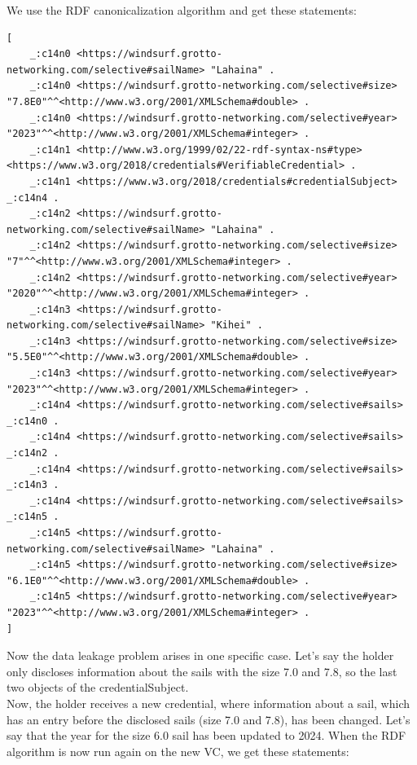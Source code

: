 \documentclass[
	a4paper               %
	,BCOR=0mm            %
	,bibliography=totoc   %
	,listof=totoc         %
	,monolingual
	,twoside=false
]{bfhthesis}              %
\begin{document}
We use the RDF canonicalization algorithm and get these statements:

\begin{lstlisting}[language=canon,firstnumber=1,caption={Example: Sails VC as statements},captionpos=b]
[
	_:c14n0 <https://windsurf.grotto-networking.com/selective#sailName> "Lahaina" .
	_:c14n0 <https://windsurf.grotto-networking.com/selective#size> "7.8E0"^^<http://www.w3.org/2001/XMLSchema#double> .
	_:c14n0 <https://windsurf.grotto-networking.com/selective#year> "2023"^^<http://www.w3.org/2001/XMLSchema#integer> .
	_:c14n1 <http://www.w3.org/1999/02/22-rdf-syntax-ns#type> <https://www.w3.org/2018/credentials#VerifiableCredential> .
	_:c14n1 <https://www.w3.org/2018/credentials#credentialSubject> _:c14n4 .
	_:c14n2 <https://windsurf.grotto-networking.com/selective#sailName> "Lahaina" .
	_:c14n2 <https://windsurf.grotto-networking.com/selective#size> "7"^^<http://www.w3.org/2001/XMLSchema#integer> .
	_:c14n2 <https://windsurf.grotto-networking.com/selective#year> "2020"^^<http://www.w3.org/2001/XMLSchema#integer> .
	_:c14n3 <https://windsurf.grotto-networking.com/selective#sailName> "Kihei" .
	_:c14n3 <https://windsurf.grotto-networking.com/selective#size> "5.5E0"^^<http://www.w3.org/2001/XMLSchema#double> .
	_:c14n3 <https://windsurf.grotto-networking.com/selective#year> "2023"^^<http://www.w3.org/2001/XMLSchema#integer> .
	_:c14n4 <https://windsurf.grotto-networking.com/selective#sails> _:c14n0 .
	_:c14n4 <https://windsurf.grotto-networking.com/selective#sails> _:c14n2 .
	_:c14n4 <https://windsurf.grotto-networking.com/selective#sails> _:c14n3 .
	_:c14n4 <https://windsurf.grotto-networking.com/selective#sails> _:c14n5 .
	_:c14n5 <https://windsurf.grotto-networking.com/selective#sailName> "Lahaina" .
	_:c14n5 <https://windsurf.grotto-networking.com/selective#size> "6.1E0"^^<http://www.w3.org/2001/XMLSchema#double> .
	_:c14n5 <https://windsurf.grotto-networking.com/selective#year> "2023"^^<http://www.w3.org/2001/XMLSchema#integer> .
]
\end{lstlisting}

Now the data leakage problem arises in one specific case.
Let's say the holder only discloses information about the sails with the size 7.0 and 7.8, so the last two objects of the credentialSubject.\\
Now, the holder receives a new credential, where information about a sail, which has an entry before the disclosed sails (size 7.0 and 7.8), has been changed.
Let's say that the year for the size 6.0 sail has been updated to 2024.
When the RDF algorithm is now run again on the new VC, we get these statements:
\end{document}
